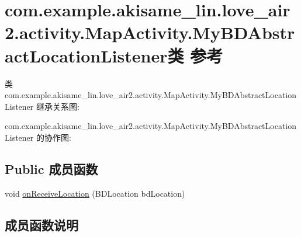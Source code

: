 \hypertarget{classcom_1_1example_1_1akisame__lin_1_1love__air2_1_1activity_1_1_map_activity_1_1_my_b_d_abstract_location_listener}{}\section{com.\+example.\+akisame\+\_\+lin.\+love\+\_\+air2.\+activity.\+Map\+Activity.\+My\+B\+D\+Abstract\+Location\+Listener类 参考}
\label{classcom_1_1example_1_1akisame__lin_1_1love__air2_1_1activity_1_1_map_activity_1_1_my_b_d_abstract_location_listener}


类 com.\+example.\+akisame\+\_\+lin.\+love\+\_\+air2.\+activity.\+Map\+Activity.\+My\+B\+D\+Abstract\+Location\+Listener 继承关系图\+:


com.\+example.\+akisame\+\_\+lin.\+love\+\_\+air2.\+activity.\+Map\+Activity.\+My\+B\+D\+Abstract\+Location\+Listener 的协作图\+:
\subsection*{Public 成员函数}
\begin{DoxyCompactItemize}
\item 
void \mbox{\hyperlink{classcom_1_1example_1_1akisame__lin_1_1love__air2_1_1activity_1_1_map_activity_1_1_my_b_d_abstract_location_listener_a76d4facc519559c38d83851a3e746efe}{on\+Receive\+Location}} (B\+D\+Location bd\+Location)
\end{DoxyCompactItemize}


\subsection{成员函数说明}
\mbox{\label{classcom_1_1example_1_1akisame__lin_1_1love__air2_1_1activity_1_1_map_activity_1_1_my_b_d_abstract_location_listener_a76d4facc519559c38d83851a3e746efe}} 
